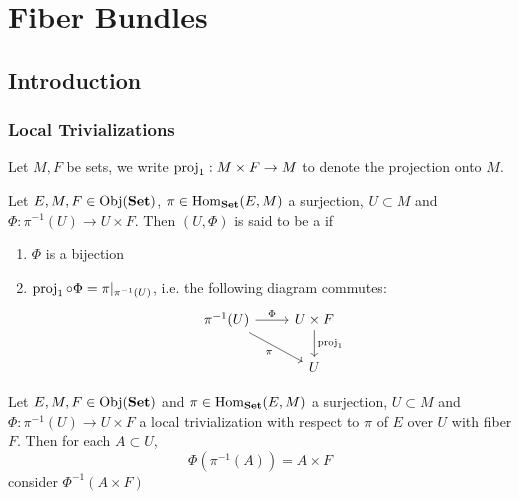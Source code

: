 \documentclass{book}
\begin{document}
	\newpage
	\chapter{Fiber Bundles}
	
	\section{Introduction}
	
	\subsection{Local Trivializations}
	
	\begin{note} 
		Let $M, F$ be sets, we write $\operatorname{\text{proj}}_1: M \times F \rightarrow M$ to denote the projection onto $M$.
	\end{note}

	\begin{defn} 
		Let $E, M, F \in \operatorname{Obj}(\operatorname*{\text{\textbf{Set}}})$, $\pi \in \operatorname{Hom}_{\operatorname*{\text{\textbf{Set}}}}(E, M)$ a surjection, $U \subset M$ and $\Phi: \pi^{-1}(U) \rightarrow U \times F$. Then $(U, \Phi)$ is said to be a   if 
		\begin{enumerate}
			\item $\Phi$ is a bijection
			\item $\operatorname{\text{proj}}_1 \circ \Phi = \pi|_{\pi^{-1}(U)}$, i.e. the following diagram commutes:
			\[ 
			\begin{tikzcd}
				\pi^{-1}(U) \arrow[r, "\Phi"] \arrow[dr, "\pi"'] & U \times F \arrow[d, "\prj_1"]  \\
				& U
			\end{tikzcd}
			\]
		\end{enumerate}
	\end{defn}
	
	\begin{ex} 
		Let $E, M, F \in \operatorname{Obj}(\operatorname*{\text{\textbf{Set}}})$ and $\pi \in \operatorname{Hom}_{\operatorname*{\text{\textbf{Set}}}}(E, M)$ a surjection, $U \subset M$ and $\Phi: \pi^{-1}(U) \rightarrow U \times F$ a local trivialization with respect to $\pi$ of $E$ over $U$ with fiber $F$. Then for each $A \subset U$, $$\Phi( \pi^{-1}(A)) = A \times F$$
		 consider $\Phi^{-1}(A \times F)$ 
	\end{ex}
	
\end{document}
